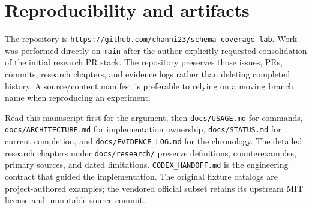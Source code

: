 \documentclass[sigconf,nonacm]{acmart}
\begin{document}
\section{Reproducibility and artifacts}
The repository is \texttt{h\allowbreak{}t\allowbreak{}t\allowbreak{}p\allowbreak{}s\allowbreak{}:\allowbreak{}/\allowbreak{}/\allowbreak{}g\allowbreak{}i\allowbreak{}t\allowbreak{}h\allowbreak{}u\allowbreak{}b\allowbreak{}.\allowbreak{}c\allowbreak{}o\allowbreak{}m\allowbreak{}/\allowbreak{}c\allowbreak{}h\allowbreak{}a\allowbreak{}n\allowbreak{}n\allowbreak{}i\allowbreak{}2\allowbreak{}3\allowbreak{}/\allowbreak{}s\allowbreak{}c\allowbreak{}h\allowbreak{}e\allowbreak{}m\allowbreak{}a\allowbreak{}-\allowbreak{}c\allowbreak{}o\allowbreak{}v\allowbreak{}e\allowbreak{}r\allowbreak{}a\allowbreak{}g\allowbreak{}e\allowbreak{}-\allowbreak{}l\allowbreak{}a\allowbreak{}b}. Work was performed directly on \texttt{m\allowbreak{}a\allowbreak{}i\allowbreak{}n} after the author explicitly requested consolidation of the initial research PR stack. The repository preserves those issues, PRs, commits, research chapters, and evidence logs rather than deleting completed history. A source/content manifest is preferable to relying on a moving branch name when reproducing an experiment.

Read this manuscript first for the argument, then \texttt{d\allowbreak{}o\allowbreak{}c\allowbreak{}s\allowbreak{}/\allowbreak{}U\allowbreak{}S\allowbreak{}A\allowbreak{}G\allowbreak{}E\allowbreak{}.\allowbreak{}m\allowbreak{}d} for commands, \texttt{d\allowbreak{}o\allowbreak{}c\allowbreak{}s\allowbreak{}/\allowbreak{}A\allowbreak{}R\allowbreak{}C\allowbreak{}H\allowbreak{}I\allowbreak{}T\allowbreak{}E\allowbreak{}C\allowbreak{}T\allowbreak{}U\allowbreak{}R\allowbreak{}E\allowbreak{}.\allowbreak{}m\allowbreak{}d} for implementation ownership, \texttt{d\allowbreak{}o\allowbreak{}c\allowbreak{}s\allowbreak{}/\allowbreak{}S\allowbreak{}T\allowbreak{}A\allowbreak{}T\allowbreak{}U\allowbreak{}S\allowbreak{}.\allowbreak{}m\allowbreak{}d} for current completion, and \texttt{d\allowbreak{}o\allowbreak{}c\allowbreak{}s\allowbreak{}/\allowbreak{}E\allowbreak{}V\allowbreak{}I\allowbreak{}D\allowbreak{}E\allowbreak{}N\allowbreak{}C\allowbreak{}E\allowbreak{}\_\allowbreak{}L\allowbreak{}O\allowbreak{}G\allowbreak{}.\allowbreak{}m\allowbreak{}d} for the chronology. The detailed research chapters under \texttt{d\allowbreak{}o\allowbreak{}c\allowbreak{}s\allowbreak{}/\allowbreak{}r\allowbreak{}e\allowbreak{}s\allowbreak{}e\allowbreak{}a\allowbreak{}r\allowbreak{}c\allowbreak{}h\allowbreak{}/} preserve definitions, counterexamples, primary sources, and dated limitations. \texttt{C\allowbreak{}O\allowbreak{}D\allowbreak{}E\allowbreak{}X\allowbreak{}\_\allowbreak{}H\allowbreak{}A\allowbreak{}N\allowbreak{}D\allowbreak{}O\allowbreak{}F\allowbreak{}F\allowbreak{}.\allowbreak{}m\allowbreak{}d} is the engineering contract that guided the implementation. The original fixture catalogs are project-authored examples; the vendored official subset retains its upstream MIT license and immutable source commit.
\end{document}
